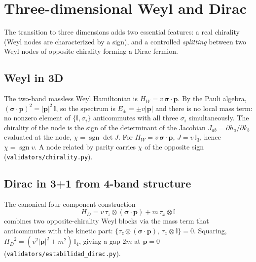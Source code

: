 \documentclass[a4paper,onecolumn,11pt]{quantumarticle}
\newcommand{\bbI}{\ensuremath{\mathbb{I}}}
\def\vp{\ensuremath{\bm{p}}}
\def\vsigma{\ensuremath{\bm{\sigma}}}
\newcommand{\HD}{\ensuremath{H_{D}}}
\newcommand{\HW}{\ensuremath{H_{W}}}
\begin{document}
\section{Three-dimensional Weyl and Dirac}
\label{p:weyl-dirac-3d}

The transition to three dimensions adds two essential features: a real
chirality (Weyl nodes are characterized by a sign), and a controlled
\emph{splitting} between two Weyl nodes of opposite chirality forming a
Dirac fermion.

\subsection{Weyl in 3D}
The two-band massless Weyl Hamiltonian is
$\HW = v\,\vsigma\cdot\vp$. By the Pauli algebra,
$(\vsigma\cdot\vp)^{2} = \lvert\vp\rvert^{2}\,\bbI$, so the spectrum is
$E_{\pm}=\pm v\lvert\vp\rvert$ and there is no local mass term: no
nonzero element of $\{\bbI,\sigma_{i}\}$ anticommutes with all three
$\sigma_{i}$ simultaneously. The chirality of the node is the sign of
the determinant of the Jacobian $J_{ab} = \partial h_{a}/\partial k_{b}$
evaluated at the node, $\chi = \operatorname{sgn}\det J$. For
$\HW = v\,\vsigma\cdot\vp$, $J=v\,\bbI_{3}$, hence $\chi = \operatorname{sgn} v$.
A node related by parity carries $\chi$ of the opposite sign
(\texttt{validators/chirality.py}).

\subsection{Dirac in 3+1 from 4-band structure}
The canonical four-component construction
\begin{equation}
\HD = v\,\tau_{z}\otimes(\vsigma\cdot\vp) + m\,\tau_{x}\otimes\bbI
\end{equation}
combines two opposite-chirality Weyl blocks via the mass term that
anticommutes with the kinetic part:
$\{\tau_{z}\otimes(\vsigma\cdot\vp),\,\tau_{x}\otimes\bbI\}=0$. Squaring,
$\HD^{2} = (v^{2}\lvert\vp\rvert^{2}+m^{2})\,\bbI_{4}$, giving a gap
$2m$ at $\vp=0$ (\texttt{validators/estabilidad\_dirac.py}).
\end{document}

